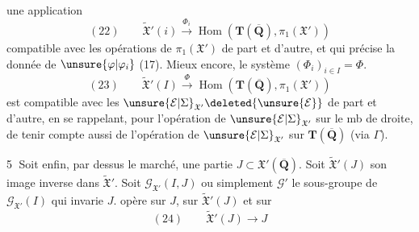 
une application
\[
(22)\qquad\widetilde{\mathfrak X}'(i)\xrightarrow{\Phi_i}\operatorname{Hom}(\mathbf T(\overline{\mathbf Q}),\pi_1(\mathfrak X'))
\]
compatible avec les opérations de $\pi_1(\mathfrak X')$
de part et d'autre, et qui précise
la donnée de $\unsure{\varphi|\varphi_i}$ (17). Mieux encore,
le système $(\Phi_i)_{i\in I}=\Phi$.
\[
(23)\qquad\widetilde{\mathfrak X}'(I)\xrightarrow{\Phi}\operatorname{Hom}(\mathbf T(\overline{\mathbf Q}),\pi_1(\mathfrak X'))
\]
est compatible avec les $\unsure{\mathcal E|\Sigma}_{\mathfrak X'}\deleted{\unsure{\mathcal E}}$ de part et
d'autre, en se rappelant, pour l'opération
de $\unsure{\mathcal E|\Sigma}_{\mathfrak X'}$ sur le mb de droite, de tenir
compte aussi de l'opération de $\unsure{\mathcal E|\Sigma}_{\mathfrak X'}$
sur $\mathbf T(\overline{\mathbf Q})$ (via $\Gamma$).

\textcircled{5} Soit enfin, par dessus le marché, une
partie $J\subset\mathfrak X'(\overline{\mathbf Q})$. Soit $\widetilde{\mathfrak X}'(J)$ son
image inverse dans $\widetilde{\mathfrak X}'$. Soit $\mathcal G_{\mathfrak X'}(I,J)$
ou simplement $\mathcal G'$ le sous-groupe de $\mathcal G_{\mathfrak X'}(I)$
qui invarie $J$.  
opère sur $J$, sur $\widetilde{\mathfrak X}'(J)$ et sur
\[
(24)\qquad\widetilde{\mathfrak X}'(J)\longrightarrow J
\]

